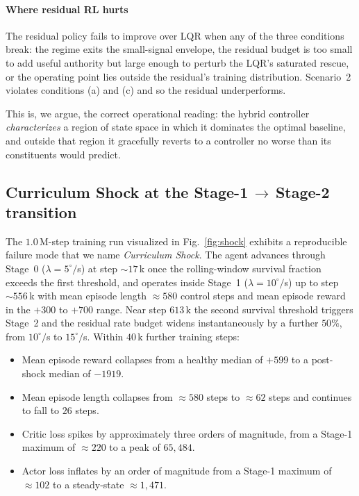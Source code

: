 \documentclass[conference]{IEEEtran}
\begin{document}
\paragraph*{Where residual RL hurts}
The residual policy fails to improve over LQR when any of the three
conditions break: the regime exits the small-signal envelope, the residual
budget is too small to add useful authority but large enough to perturb the
LQR's saturated rescue, or the operating point lies outside the residual's
training distribution. Scenario~2 violates conditions (a) and (c) and so the
residual underperforms.

This is, we argue, the correct operational reading: the hybrid controller
\emph{characterizes} a region of state space in which it dominates the
optimal baseline, and outside that region it gracefully reverts to a
controller no worse than its constituents would predict.

\subsection{Curriculum Shock at the Stage-1\,$\rightarrow$\,Stage-2 transition}
\label{sec:shock}
The $1.0\,$M-step training run visualized in Fig.~\ref{fig:shock} exhibits
a reproducible failure mode that we name \emph{Curriculum Shock}.
The agent advances through Stage~0 ($\lambda=5^\circ/$s) at step
$\sim 17\,$k once the rolling-window survival fraction exceeds the first
threshold, and operates inside Stage~1 ($\lambda=10^\circ/$s) up to
step $\sim 556\,$k with mean episode length $\approx 580$ control steps and
mean episode reward in the $+300$ to $+700$ range. Near step $613\,$k the
second survival threshold triggers Stage~2 and the residual rate budget
widens instantaneously by a further $50\%$, from $10^\circ/$s to
$15^\circ/$s. Within $40\,$k further training steps:
\begin{itemize}
  \item Mean episode reward collapses from a healthy median of $+599$ to a
        post-shock median of $-1919$.
  \item Mean episode length collapses from $\approx 580$ steps to $\approx
        62$ steps and continues to fall to $26$ steps.
  \item Critic loss spikes by approximately three orders of magnitude, from
        a Stage-1 maximum of $\approx 220$ to a peak of $65{,}484$.
  \item Actor loss inflates by an order of magnitude from a Stage-1 maximum
        of $\approx 102$ to a steady-state $\approx 1{,}471$.
\end{itemize}
\end{document}
